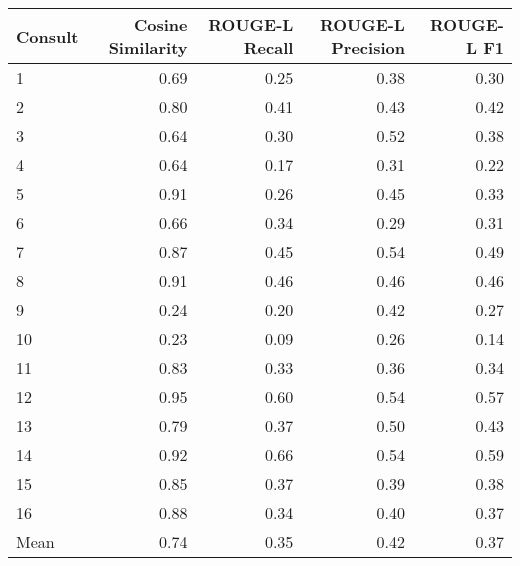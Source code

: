 \begin{tabular}{lrrrr}
\toprule
Consult & Cosine Similarity & ROUGE-L Recall & ROUGE-L Precision & ROUGE-L F1 \\
\midrule
1 & 0.69 & 0.25 & 0.38 & 0.30 \\
2 & 0.80 & 0.41 & 0.43 & 0.42 \\
3 & 0.64 & 0.30 & 0.52 & 0.38 \\
4 & 0.64 & 0.17 & 0.31 & 0.22 \\
5 & 0.91 & 0.26 & 0.45 & 0.33 \\
6 & 0.66 & 0.34 & 0.29 & 0.31 \\
7 & 0.87 & 0.45 & 0.54 & 0.49 \\
8 & 0.91 & 0.46 & 0.46 & 0.46 \\
9 & 0.24 & 0.20 & 0.42 & 0.27 \\
10 & 0.23 & 0.09 & 0.26 & 0.14 \\
11 & 0.83 & 0.33 & 0.36 & 0.34 \\
12 & 0.95 & 0.60 & 0.54 & 0.57 \\
13 & 0.79 & 0.37 & 0.50 & 0.43 \\
14 & 0.92 & 0.66 & 0.54 & 0.59 \\
15 & 0.85 & 0.37 & 0.39 & 0.38 \\
16 & 0.88 & 0.34 & 0.40 & 0.37 \\
Mean & 0.74 & 0.35 & 0.42 & 0.37 \\
\bottomrule
\end{tabular}
